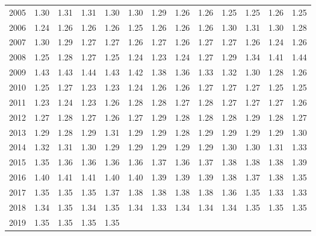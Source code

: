 \begin{longtable}{rrrrrrrrrrrrr}
  2005 & 1.30 & 1.31 & 1.31 & 1.30 & 1.30 & 1.29 & 1.26 & 1.26 & 1.25 & 1.25 & 1.26 & 1.25 \\ 
  2006 & 1.24 & 1.26 & 1.26 & 1.26 & 1.25 & 1.26 & 1.26 & 1.26 & 1.30 & 1.31 & 1.30 & 1.28 \\ 
  2007 & 1.30 & 1.29 & 1.27 & 1.27 & 1.26 & 1.27 & 1.26 & 1.27 & 1.27 & 1.26 & 1.24 & 1.26 \\ 
  2008 & 1.25 & 1.28 & 1.27 & 1.25 & 1.24 & 1.23 & 1.24 & 1.27 & 1.29 & 1.34 & 1.41 & 1.44 \\ 
  2009 & 1.43 & 1.43 & 1.44 & 1.43 & 1.42 & 1.38 & 1.36 & 1.33 & 1.32 & 1.30 & 1.28 & 1.26 \\ 
  2010 & 1.25 & 1.27 & 1.23 & 1.23 & 1.24 & 1.26 & 1.26 & 1.27 & 1.27 & 1.27 & 1.25 & 1.25 \\ 
  2011 & 1.23 & 1.24 & 1.23 & 1.26 & 1.28 & 1.28 & 1.27 & 1.28 & 1.27 & 1.27 & 1.27 & 1.26 \\ 
  2012 & 1.27 & 1.28 & 1.27 & 1.26 & 1.27 & 1.29 & 1.28 & 1.28 & 1.28 & 1.29 & 1.28 & 1.27 \\ 
  2013 & 1.29 & 1.28 & 1.29 & 1.31 & 1.29 & 1.29 & 1.28 & 1.29 & 1.29 & 1.29 & 1.29 & 1.30 \\ 
  2014 & 1.32 & 1.31 & 1.30 & 1.29 & 1.29 & 1.29 & 1.29 & 1.29 & 1.30 & 1.30 & 1.31 & 1.33 \\ 
  2015 & 1.35 & 1.36 & 1.36 & 1.36 & 1.36 & 1.37 & 1.36 & 1.37 & 1.38 & 1.38 & 1.38 & 1.39 \\ 
  2016 & 1.40 & 1.41 & 1.41 & 1.40 & 1.40 & 1.39 & 1.39 & 1.39 & 1.38 & 1.37 & 1.38 & 1.35 \\ 
  2017 & 1.35 & 1.35 & 1.35 & 1.37 & 1.38 & 1.38 & 1.38 & 1.38 & 1.36 & 1.35 & 1.33 & 1.33 \\ 
  2018 & 1.34 & 1.35 & 1.34 & 1.35 & 1.34 & 1.33 & 1.34 & 1.34 & 1.34 & 1.35 & 1.35 & 1.35 \\ 
  2019 & 1.35 & 1.35 & 1.35 & 1.35 &  &  &  &  &  &  &  &  \\ 
   \hline
\hline
\end{longtable}
